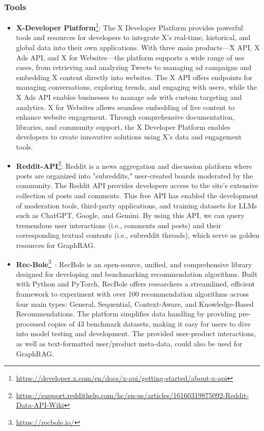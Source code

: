 \subsubsection{Tools} 
\begin{itemize}[leftmargin=*]
    \item \textbf{X-Developer Platform}\footnote{\href{https://developer.x.com/en/docs/x-api/getting-started/about-x-api}{https://developer.x.com/en/docs/x-api/getting-started/about-x-api}}: The X Developer Platform provides powerful tools and resources for developers to integrate X's real-time, historical, and global data into their own applications. With three main products—X API, X Ads API, and X for Websites—the platform supports a wide range of use cases, from retrieving and analyzing Tweets to managing ad campaigns and embedding X content directly into websites. The X API offers endpoints for managing conversations, exploring trends, and engaging with users, while the X Ads API enables businesses to manage ads with custom targeting and analytics. X for Websites allows seamless embedding of live content to enhance website engagement. Through comprehensive documentation, libraries, and community support, the X Developer Platform enables developers to create innovative solutions using X’s data and engagement tools.
    
    \item \textbf{Reddit-API}\footnote{\href{https://support.reddithelp.com/hc/en-us/articles/16160319875092-Reddit-Data-API-Wiki}{https://support.reddithelp.com/hc/en-us/articles/16160319875092-Reddit-Data-API-Wiki}}: Reddit is a news aggregation and discussion platform where posts are organized into "subreddits," user-created boards moderated by the community. The Reddit API provides developers access to the site’s extensive collection of posts and comments. This free API has enabled the development of moderation tools, third-party applications, and training datasets for LLMs such as ChatGPT, Google, and Gemini. By using this API, we can query tremendous user interactions (i.e., comments and posts) and their corresponding textual contents (i.e., subreddit threads), which serve as golden resources for GraphRAG.
    
    \item \textbf{Rec-Bole}\footnote{\href{https://recbole.io/}{https://recbole.io/}}~\cite{zhao2021recbole}: RecBole is an open-source, unified, and comprehensive library designed for developing and benchmarking recommendation algorithms. Built with Python and PyTorch, RecBole offers researchers a streamlined, efficient framework to experiment with over 100 recommendation algorithms across four main types: General, Sequential, Context-Aware, and Knowledge-Based Recommendations. The platform simplifies data handling by providing pre-processed copies of 43 benchmark datasets, making it easy for users to dive into model testing and development. The provided user-product interactions, as well as text-formatted user/product meta-data, could also be used for GraphRAG.
\end{itemize}
